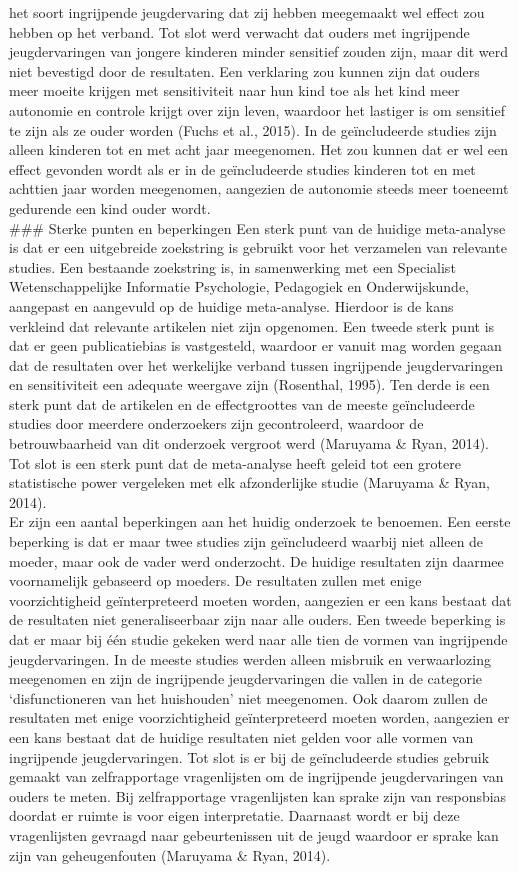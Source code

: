\documentclass[12pt]{article}
\begin{document}
het soort ingrijpende jeugdervaring dat zij hebben meegemaakt wel effect
zou hebben op het verband. Tot slot werd verwacht dat ouders met
ingrijpende jeugdervaringen van jongere kinderen minder sensitief zouden
zijn, maar dit werd niet bevestigd door de resultaten. Een verklaring
zou kunnen zijn dat ouders meer moeite krijgen met sensitiviteit naar
hun kind toe als het kind meer autonomie en controle krijgt over zijn
leven, waardoor het lastiger is om sensitief te zijn als ze ouder worden
(Fuchs et al., 2015). In de geïncludeerde studies zijn alleen kinderen
tot en met acht jaar meegenomen. Het zou kunnen dat er wel een effect
gevonden wordt als er in de geïncludeerde studies kinderen tot en met
achttien jaar worden meegenomen, aangezien de autonomie steeds meer
toeneemt gedurende een kind ouder wordt.\\
\#\#\# Sterke punten en beperkingen Een sterk punt van de huidige
meta-analyse is dat er een uitgebreide zoekstring is gebruikt voor het
verzamelen van relevante studies. Een bestaande zoekstring is, in
samenwerking met een Specialist Wetenschappelijke Informatie
Psychologie, Pedagogiek en Onderwijskunde, aangepast en aangevuld op de
huidige meta-analyse. Hierdoor is de kans verkleind dat relevante
artikelen niet zijn opgenomen. Een tweede sterk punt is dat er geen
publicatiebias is vastgesteld, waardoor er vanuit mag worden gegaan dat
de resultaten over het werkelijke verband tussen ingrijpende
jeugdervaringen en sensitiviteit een adequate weergave zijn (Rosenthal,
1995). Ten derde is een sterk punt dat de artikelen en de effectgroottes
van de meeste geïncludeerde studies door meerdere onderzoekers zijn
gecontroleerd, waardoor de betrouwbaarheid van dit onderzoek vergroot
werd (Maruyama \& Ryan, 2014). Tot slot is een sterk punt dat de
meta-analyse heeft geleid tot een grotere statistische power vergeleken
met elk afzonderlijke studie (Maruyama \& Ryan, 2014).\\
Er zijn een aantal beperkingen aan het huidig onderzoek te benoemen. Een
eerste beperking is dat er maar twee studies zijn geïncludeerd waarbij
niet alleen de moeder, maar ook de vader werd onderzocht. De huidige
resultaten zijn daarmee voornamelijk gebaseerd op moeders. De resultaten
zullen met enige voorzichtigheid geïnterpreteerd moeten worden,
aangezien er een kans bestaat dat de resultaten niet generaliseerbaar
zijn naar alle ouders. Een tweede beperking is dat er maar bij één
studie gekeken werd naar alle tien de vormen van ingrijpende
jeugdervaringen. In de meeste studies werden alleen misbruik en
verwaarlozing meegenomen en zijn de ingrijpende jeugdervaringen die
vallen in de categorie `disfunctioneren van het huishouden' niet
meegenomen. Ook daarom zullen de resultaten met enige voorzichtigheid
geïnterpreteerd moeten worden, aangezien er een kans bestaat dat de
huidige resultaten niet gelden voor alle vormen van ingrijpende
jeugdervaringen. Tot slot is er bij de geïncludeerde studies gebruik
gemaakt van zelfrapportage vragenlijsten om de ingrijpende
jeugdervaringen van ouders te meten. Bij zelfrapportage vragenlijsten
kan sprake zijn van responsbias doordat er ruimte is voor eigen
interpretatie. Daarnaast wordt er bij deze vragenlijsten gevraagd naar
gebeurtenissen uit de jeugd waardoor er sprake kan zijn van
geheugenfouten (Maruyama \& Ryan, 2014).
\end{document}
